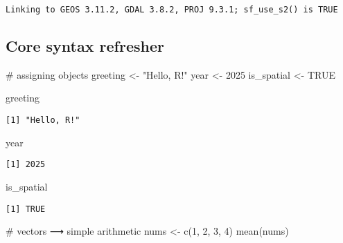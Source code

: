 \documentclass[
  letterpaper,
  DIV=11,
  numbers=noendperiod]{scrreprt}
\newenvironment{Shaded}{\begin{snugshade}}{\end{snugshade}}
\newcommand{\CommentTok}[1]{\textcolor[rgb]{0.37,0.37,0.37}{#1}}
\newcommand{\ConstantTok}[1]{\textcolor[rgb]{0.56,0.35,0.01}{#1}}
\newcommand{\DecValTok}[1]{\textcolor[rgb]{0.68,0.00,0.00}{#1}}
\newcommand{\FunctionTok}[1]{\textcolor[rgb]{0.28,0.35,0.67}{#1}}
\newcommand{\NormalTok}[1]{\textcolor[rgb]{0.00,0.23,0.31}{#1}}
\newcommand{\OtherTok}[1]{\textcolor[rgb]{0.00,0.23,0.31}{#1}}
\newcommand{\StringTok}[1]{\textcolor[rgb]{0.13,0.47,0.30}{#1}}
\begin{document}
\begin{verbatim}
Linking to GEOS 3.11.2, GDAL 3.8.2, PROJ 9.3.1; sf_use_s2() is TRUE
\end{verbatim}

\hypertarget{core-syntax-refresher}{%
\subsection{Core syntax refresher}\label{core-syntax-refresher}}

\begin{Shaded}
\begin{Highlighting}[]
\CommentTok{\# assigning objects}
\NormalTok{greeting }\OtherTok{\textless{}{-}} \StringTok{"Hello, R!"}
\NormalTok{year     }\OtherTok{\textless{}{-}} \DecValTok{2025}
\NormalTok{is\_spatial }\OtherTok{\textless{}{-}} \ConstantTok{TRUE}
\end{Highlighting}
\end{Shaded}

\begin{Shaded}
\begin{Highlighting}[]
\NormalTok{greeting}
\end{Highlighting}
\end{Shaded}

\begin{verbatim}
[1] "Hello, R!"
\end{verbatim}

\begin{Shaded}
\begin{Highlighting}[]
\NormalTok{year}
\end{Highlighting}
\end{Shaded}

\begin{verbatim}
[1] 2025
\end{verbatim}

\begin{Shaded}
\begin{Highlighting}[]
\NormalTok{is\_spatial}
\end{Highlighting}
\end{Shaded}

\begin{verbatim}
[1] TRUE
\end{verbatim}

\begin{Shaded}
\begin{Highlighting}[]
\CommentTok{\# vectors ⟶ simple arithmetic}
\NormalTok{nums }\OtherTok{\textless{}{-}} \FunctionTok{c}\NormalTok{(}\DecValTok{1}\NormalTok{, }\DecValTok{2}\NormalTok{, }\DecValTok{3}\NormalTok{, }\DecValTok{4}\NormalTok{)}
\FunctionTok{mean}\NormalTok{(nums)}
\end{Highlighting}
\end{Shaded}
\end{document}
